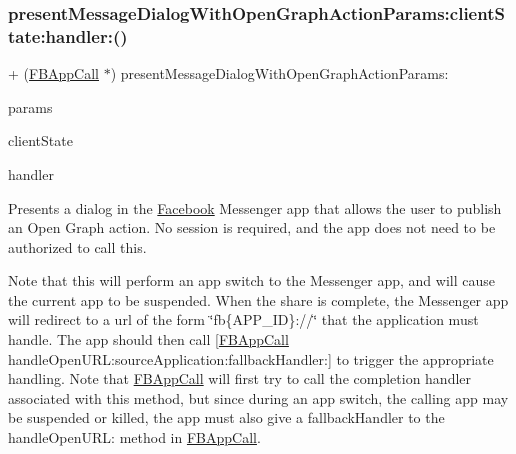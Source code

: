 \subsubsection{\texorpdfstring{present\+Message\+Dialog\+With\+Open\+Graph\+Action\+Params\+:client\+State\+:handler\+:()}{presentMessageDialogWithOpenGraphActionParams:clientState:handler:()}\hspace{0.1cm}{\footnotesize\ttfamily [2/5]}}
{\footnotesize\ttfamily + (\hyperlink{interfaceFBAppCall}{F\+B\+App\+Call} $\ast$) present\+Message\+Dialog\+With\+Open\+Graph\+Action\+Params\+: \begin{DoxyParamCaption}\item[{(\hyperlink{interfaceFBOpenGraphActionParams}{F\+B\+Open\+Graph\+Action\+Params} $\ast$)}]{params }\item[{clientState:(N\+S\+Dictionary $\ast$)}]{client\+State }\item[{handler:(F\+B\+Dialog\+App\+Call\+Completion\+Handler)}]{handler }\end{DoxyParamCaption}}

Presents a dialog in the \hyperlink{interfaceFacebook}{Facebook} Messenger app that allows the user to publish an Open Graph action. No session is required, and the app does not need to be authorized to call this.

Note that this will perform an app switch to the Messenger app, and will cause the current app to be suspended. When the share is complete, the Messenger app will redirect to a url of the form \char`\"{}fb\{\+A\+P\+P\+\_\+\+I\+D\}\+://\char`\"{} that the application must handle. The app should then call \mbox{[}\hyperlink{interfaceFBAppCall}{F\+B\+App\+Call} handle\+Open\+U\+R\+L\+:source\+Application\+:fallback\+Handler\+:\mbox{]} to trigger the appropriate handling. Note that \hyperlink{interfaceFBAppCall}{F\+B\+App\+Call} will first try to call the completion handler associated with this method, but since during an app switch, the calling app may be suspended or killed, the app must also give a fallback\+Handler to the handle\+Open\+U\+RL\+: method in \hyperlink{interfaceFBAppCall}{F\+B\+App\+Call}.


